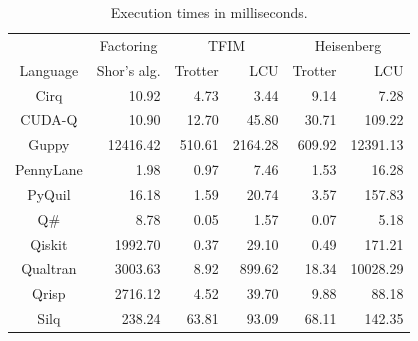 \begin{table}[t]
  \centering
  \caption{Execution times in milliseconds.}
  \begin{tabular}{c|r|rr|rr}
    \toprule
             & \multicolumn{1}{c|}{Factoring}
             & \multicolumn{2}{c|}{TFIM} & \multicolumn{2}{c}{Heisenberg} \\
    Language & Shor's alg. & Trotter & LCU & Trotter & LCU \\
    \midrule
    Cirq             &    10.92 &     4.73 &     3.44 &     9.14 &     7.28 \\
    CUDA-Q           &    10.90 &    12.70 &    45.80 &    30.71 &   109.22 \\
    Guppy            & 12416.42 &   510.61 &  2164.28 &   609.92 & 12391.13 \\
    PennyLane        &     1.98 &     0.97 &     7.46 &     1.53 &    16.28 \\
    PyQuil           &    16.18 &     1.59 &    20.74 &     3.57 &   157.83 \\
    Q\#              &     8.78 &     0.05 &     1.57 &     0.07 &     5.18 \\
    Qiskit           &  1992.70 &     0.37 &    29.10 &     0.49 &   171.21 \\
    Qualtran         &  3003.63 &     8.92 &   899.62 &    18.34 & 10028.29 \\
    \hline
    Qrisp            &  2716.12 &     4.52 &    39.70 &     9.88 &    88.18 \\
    Silq             &   238.24 &    63.81 &    93.09 &    68.11 &   142.35 \\
    \bottomrule
  \end{tabular}
  \label{tab:experimental-results}
\end{table}
%
